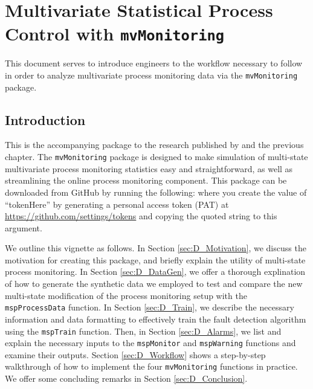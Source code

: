 \documentclass{report}\usepackage[]{graphicx}\usepackage[]{color}
\begin{document}
\chapter{Multivariate Statistical Process Control with \texttt{mvMonitoring}}

This document serves to introduce engineers to the workflow necessary to follow in order to analyze multivariate process monitoring data via the \texttt{mvMonitoring} package.



\section{Introduction} \label{sec:intro}

This is the accompanying package to the research published by \cite{kazor_comparison_2016} and the previous chapter. The \texttt{mvMonitoring} package is designed to make simulation of multi-state multivariate process monitoring statistics easy and straightforward, as well as streamlining the online process monitoring component. This package can be downloaded from GitHub by running the following:
\noindent where you create the value of ``tokenHere'' by generating a personal access token (PAT) at \url{https://github.com/settings/tokens} and copying the quoted string to this argument.


We outline this vignette as follows. In Section \ref{sec:D_Motivation}, we discuss the motivation for creating this package, and briefly explain the utility of multi-state process monitoring. In Section \ref{sec:D_DataGen}, we offer a thorough explination of how to generate the synthetic data we employed to test and compare the new multi-state modification of the process monitoring setup with the \texttt{mspProcessData} function. In Section \ref{sec:D_Train}, we describe the necessary information and data formatting to effectively train the fault detection algorithm using the \texttt{mspTrain} function. Then, in Section \ref{sec:D_Alarms}, we list and explain the necessary inputs to the \texttt{mspMonitor} and \texttt{mspWarning} functions and examine their outputs. Section \ref{sec:D_Workflow} shows a step-by-step walkthrough of how to implement the four \texttt{mvMonitoring} functions in practice. We offer some concluding remarks in Section \ref{sec:D_Conclusion}.
\end{document}
